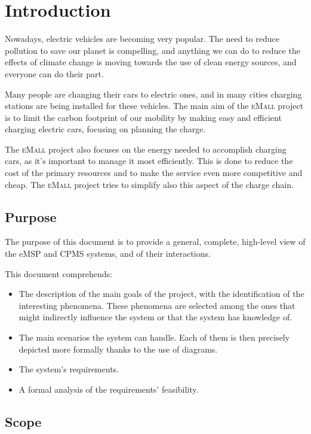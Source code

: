 \chapter{Introduction} \label{introduction}

Nowadays, electric vehicles are becoming very popular. The need to reduce pollution to save our planet is compelling, and anything we can do to reduce the effects of climate change is moving towards the use of clean energy sources, and everyone can do their part.\medskip

Many people are changing their cars to electric ones, and in many cities charging stations are being installed for these vehicles. The main aim of the \textsc{eMall} project is to limit the carbon footprint of our mobility by making easy and efficient charging electric cars, focusing on planning the charge.\medskip

The \textsc{eMall} project also focuses on the energy needed to accomplish charging cars, as it's important to manage it most efficiently. This is done to reduce the cost of the primary resources and to make the service even more competitive and cheap. The \textsc{eMall} project tries to simplify also this aspect of the charge chain.

\section{Purpose}

The purpose of this document is to provide a general, complete, high-level view of the eMSP and CPMS systems, and of their interactions.\medskip

This document comprehends:
\begin{itemize}
    \item The description of the main goals of the project, with the identification of the interesting phenomena. These phenomena are selected among the ones that might indirectly influence the system or that the system has knowledge of.
    \item The main scenarios the system can handle. Each of them is then precisely depicted more formally thanks to the use of diagrams.
    \item The system's requirements.
    \item A formal analysis of the requirements' feasibility.
\end{itemize}

\section{Scope}

